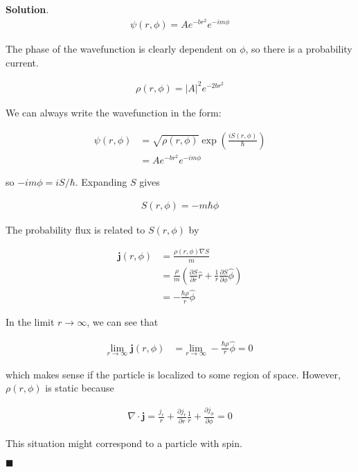 \documentclass[12pt]{article}
\theoremstyle{definition}
\newenvironment{s}{%
        \begin{trivlist} \item \textbf{Solution}. }{%
            \hspace*{\fill} $\blacksquare$\end{trivlist}}%
\begin{document}
{\begin{s}
\begin{align*}
\psi(r,\phi) = Ae^{-br^{2}}e^{-im\phi}
\end{align*}

The phase of the wavefunction is clearly dependent on $\phi$, so there is a probability current.  

\begin{align*}
\rho(r,\phi) = |A|^{2}e^{-2br^{2}}
\end{align*}

We can always write the wavefunction in the form:

\begin{align*}
\psi(r,\phi) &= \sqrt{\rho(r,\phi)}\exp\left(\frac{iS(r,\phi)}{\hbar}\right)\\
&= Ae^{-br^{2}}e^{-im\phi}
\end{align*}

so $-im\phi = iS/\hbar$. Expanding $S$ gives

\begin{align*}
S(r,\phi) = -m\hbar\phi
\end{align*}

The probability flux is related to $S(r,\phi)$ by

\begin{align*}
\bm{j}(r,\phi) &= \frac{\rho(r,\phi)\nabla S}{m}\\
&= \frac{\rho}{m}\left(\frac{\partial S}{\partial r}\hat{r} + \frac{1}{r}\frac{\partial S}{\partial \phi}\hat{\phi}\right)\\
&= -\frac{\hbar\rho}{r}\hat{\phi}
\end{align*}

In the limit $r\rightarrow\infty$, we can see that 

\begin{align*}
\underset{r\rightarrow\infty}{\mathrm{lim}}\;\bm{j}(r,\phi) &= \underset{r\rightarrow\infty}{\mathrm{lim}}\; -\frac{\hbar\rho}{r}\hat{\phi} = 0
\end{align*}

which makes sense if the particle is localized to some region of space. However, $\rho(r,\phi)$ is static because

\begin{align*}
\nabla \cdot \bm{j} = \frac{j_{r}}{r} + \frac{\partial j_{r}}{\partial r} \frac{1}{r} + \frac{\partial j_{\phi}}{\partial\phi} = 0
\end{align*}

This situation might correspond to a particle with spin.

\end{s}
\end{document}

